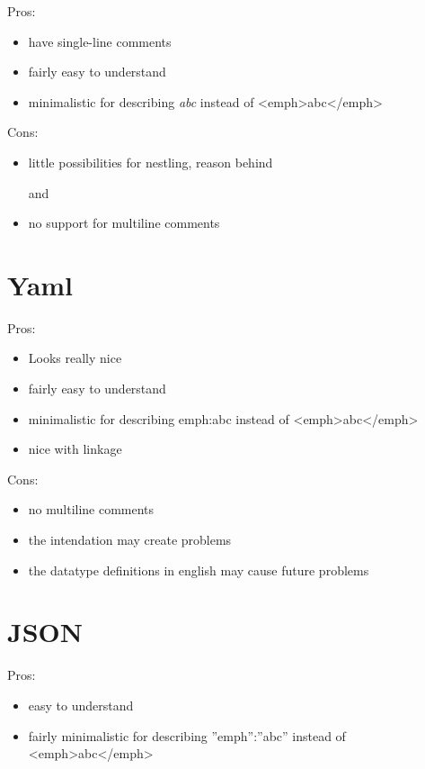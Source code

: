 \documentclass{book}
\begin{document}
	Pros:
	
	\begin{itemize}
		\item have single-line comments
		\item fairly easy to understand
		\item minimalistic for describing \emph{abc} instead of <emph>abc</emph>
	\end{itemize}
	
	Cons:
	
	\begin{itemize}
		\item little possibilities for nestling, reason behind \begin{} and \end{}
		\item no support for multiline comments
	\end{itemize}
	
	\section{Yaml}
	
	Pros:
	
	\begin{itemize}
		\item Looks really nice
		\item fairly easy to understand
		\item minimalistic for describing emph:abc instead of <emph>abc</emph>
		\item nice with linkage
	\end{itemize}
	
	Cons:
	
	\begin{itemize}
		\item no multiline comments
		\item the intendation may create problems
		\item the datatype definitions in english may cause future problems
	\end{itemize}
	
	\section{JSON}
	
	Pros:
	
	\begin{itemize}
		\item easy to understand
		\item fairly minimalistic for describing ''emph'':''abc'' instead of <emph>abc</emph>
	\end{itemize}
	
\end{document}

